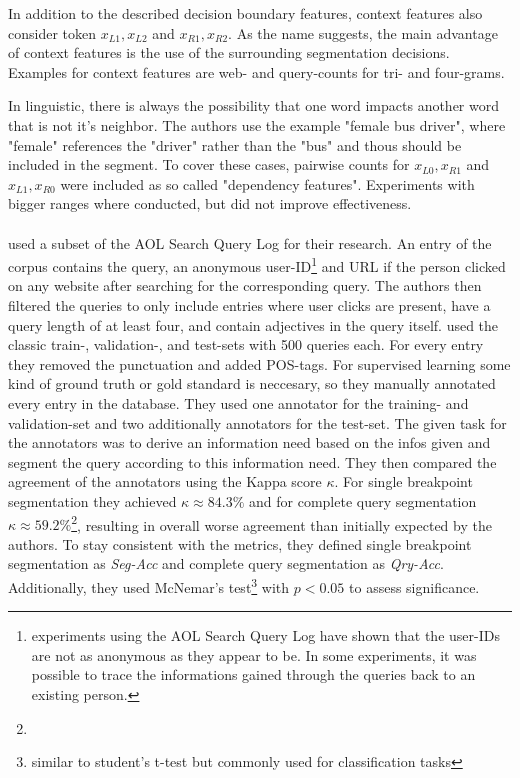 In addition to the described decision boundary features, context features also consider token $x_{L1}, x_{L2}$ and $x_{R1}, x_{R2}$. As the name suggests, the main advantage of context features is the use of the surrounding segmentation decisions. Examples for context features are web- and query-counts for tri- and four-grams.



In linguistic, there is always the possibility that one word impacts another word that is not it's neighbor. The authors use the example "female bus driver", where "female" references the "driver" rather than the "bus" and thous should be included in the segment. To cover these cases, pairwise counts for $x_{L0},x_{R1}$ and $x_{L1},x_{R0}$ were included as so called "dependency features". Experiments with bigger ranges where conducted, but did not improve effectiveness.\\
\\
\citeauthor{Bergsma:2007} used a subset of the AOL Search Query Log \cite{Pass:2006} for their research. An entry of the corpus contains the query, an anonymous user-ID\footnote{experiments using the AOL Search Query Log have shown that the user-IDs are not as anonymous as they appear to be. In some experiments, it was possible to trace the informations gained through the queries back to an existing person.} and URL if the person clicked on any website after searching for the corresponding query.
The authors then filtered the queries to only include entries where user clicks are present, have a query length of at least four, and contain adjectives in the query itself.
\citeauthor{Bergsma:2007} used the classic train-, validation-, and test-sets with 500 queries each. For every entry they removed the punctuation and added POS-tags. For supervised learning some kind of ground truth or gold standard is neccesary, so they manually annotated every entry in the database. They used one annotator for the training- and validation-set and two additionally annotators for the test-set. The given task for the annotators was to derive an information need based on the infos given and segment the query according to this information need. They then compared the agreement of the annotators using the Kappa score $\kappa$. For single breakpoint segmentation they achieved $\kappa \approx 84.3\%$ and for complete query segmentation $\kappa \approx 59.2\%$\footnote{}, resulting in overall worse agreement than initially expected by the authors.
To stay consistent with the metrics, they defined single breakpoint segmentation as \textit{Seg-Acc} and complete query segmentation as \textit{Qry-Acc}. Additionally, they used McNemar's test\footnote{similar to student's t-test but commonly used for classification tasks} with $p<0.05$ to assess significance.

